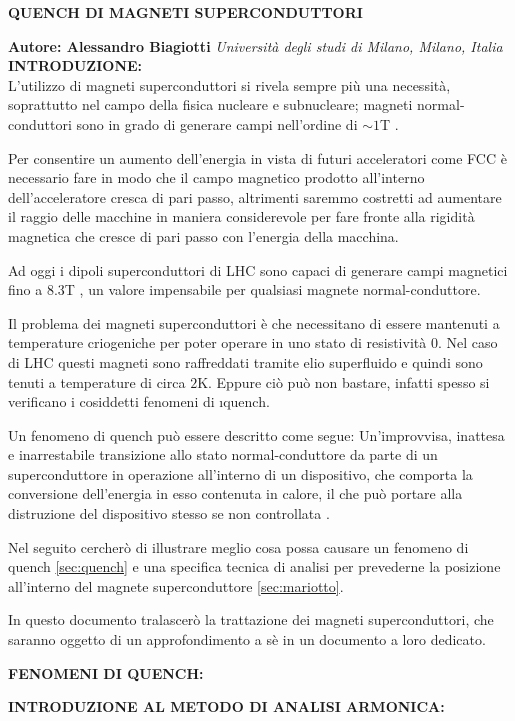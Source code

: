 \documentclass[a4paper,10pt]{article}
\begin{document}
\noindent
\begin{center}
	\textbf{{\Large QUENCH DI MAGNETI SUPERCONDUTTORI}} \\
\end{center}

\noindent
\textbf{Autore: Alessandro Biagiotti} \hfill \textit{Università degli studi di Milano, Milano,
	Italia}
\\

\noindent
{}
\makeatletter\def\@currentlabel{\texttt{(I)}}\makeatother
\label{sec:intro}
\textbf{INTRODUZIONE:}
\\
L'utilizzo di magneti superconduttori si rivela sempre più una necessità, soprattutto nel campo
della fisica nucleare e subnucleare; magneti normal-conduttori sono in grado di generare campi
nell'ordine di $\sim 1$T \cite{magnets}.

Per consentire un aumento dell'energia in vista di futuri acceleratori come FCC è necessario fare
in
modo che il campo magnetico prodotto all'interno dell'acceleratore cresca di pari passo, altrimenti
saremmo costretti ad aumentare il raggio delle macchine in maniera considerevole per fare fronte
alla rigidità magnetica che cresce di pari passo con l'energia della macchina.

Ad oggi i dipoli superconduttori di LHC sono capaci di generare campi magnetici fino a $8.3$T
\cite{lhc-field}, un valore impensabile per qualsiasi magnete normal-conduttore.

Il problema dei magneti superconduttori è che necessitano di essere mantenuti a temperature
criogeniche per poter operare in uno stato di resistività $0$. Nel caso di LHC questi magneti sono
raffreddati tramite elio superfluido e quindi sono tenuti a temperature di circa $2$K. Eppure ciò
può non bastare, infatti spesso si verificano i cosiddetti fenomeni di \i{quench}.

Un fenomeno di quench può essere descritto come segue: Un'improvvisa, inattesa e inarrestabile
transizione allo stato normal-conduttore da parte di un superconduttore in operazione all'interno
di
un dispositivo, che comporta la conversione dell'energia in esso contenuta in calore, il che può
portare alla distruzione del dispositivo stesso se non controllata \cite{quench-pres}.

Nel seguito cercherò di illustrare meglio cosa possa causare un fenomeno di quench
\ref{sec:quench} e una specifica tecnica di analisi per prevederne la posizione all'interno del
magnete superconduttore \ref{sec:mariotto}.

In questo documento tralascerò la trattazione dei magneti superconduttori, che saranno oggetto di
un
approfondimento a sè in un documento a loro dedicato.

\bigskip
{}
\makeatletter\def\@currentlabel{\texttt{(II)}}\makeatother
\label{sec:quench}
\noindent
\textbf{FENOMENI DI QUENCH:}

\bigskip
{}
\makeatletter\def\@currentlabel{\texttt{(III)}}\makeatother
\label{sec:mariotto}
\noindent
\textbf{INTRODUZIONE AL METODO DI ANALISI ARMONICA:}

\clearpage


\end{document}
